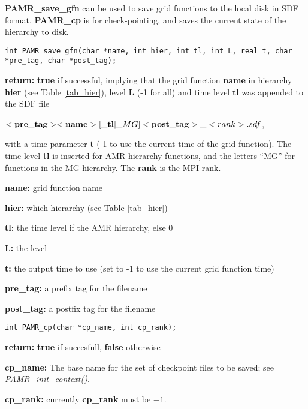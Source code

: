 \documentclass[aps,amssymb,unsortedaddress,nofootinbib]{revtex4}
\def\lsep{\itemsep 0.05in}
\begin{document}
{\bf PAMR\_save\_gfn} can be used to save grid functions to the local disk in SDF 
\cite{rnpl} format. {\bf PAMR\_cp} is for check-pointing, and saves
the current state of the hierarchy to disk.

\begin{verbatim}
int PAMR_save_gfn(char *name, int hier, int tl, int L, real t, char *pre_tag, char *post_tag);
\end{verbatim}
\begin{list}{}{\lsep}
\item {\bf return:} {\bf true} if successful, implying that the grid function {\bf name}
                               in hierarchy {\bf hier} (see Table \ref{tab_hier}), 
                               level {\bf L} (-1 for all) and time level {\bf tl}
                               was appended to the SDF file 

                               $<{\bf pre\_tag}><{\bf name}>[\_{\bf tl}|\_MG]<{\bf post\_tag}>\_<rank>.sdf$,

                               with a time parameter {\bf t} (-1 to use the current time of 
                               the grid function). The time level {\bf tl} is inserted for
                               AMR hierarchy functions, and the letters ``MG'' for functions
                               in the MG hierarchy. The {\bf rank} is the MPI rank.

\item {\bf *name:} grid function name
\item {\bf hier:} which hierarchy (see Table \ref{tab_hier})
\item {\bf tl:} the time level if the AMR hierarchy, else 0
\item {\bf L:} the level 
\item {\bf t:} the output time to use (set to -1 to use the current grid function time)
\item {\bf *pre\_tag:} a prefix tag for the filename
\item {\bf *post\_tag:} a postfix tag for the filename
\end{list}

\begin{verbatim}
int PAMR_cp(char *cp_name, int cp_rank);
\end{verbatim}
\begin{list}{}{\lsep}
\item {\bf return:} {\bf true} if succesfull, {\bf false} otherwise
\item {\bf *cp\_name:} The base name for the set of checkpoint files to
be saved; see {\em PAMR\_init\_context()}.
\item {\bf cp\_rank:} currently {\bf cp\_rank} must be $-1$.
\end{list}
\end{document}
